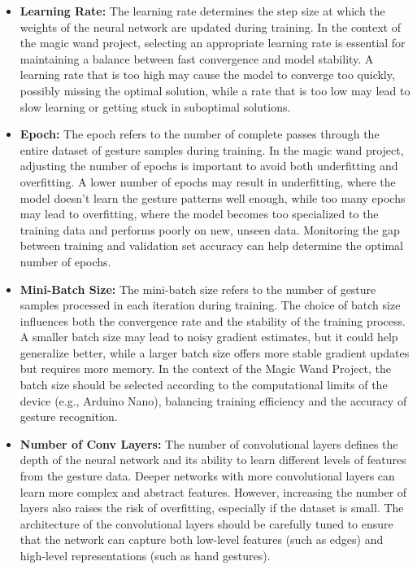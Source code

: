 \begin{itemize}
	\item \textbf{Learning Rate:} The learning rate determines the step size at which the weights of the neural network are updated during training. In the context of the magic wand project, selecting an appropriate learning rate is essential for maintaining a balance between fast convergence and model stability. A learning rate that is too high may cause the model to converge too quickly, possibly missing the optimal solution, while a rate that is too low may lead to slow learning or getting stuck in suboptimal solutions.
	
	\item \textbf{Epoch:} The epoch refers to the number of complete passes through the entire dataset of gesture samples during training. In the magic wand project, adjusting the number of epochs is important to avoid both underfitting and overfitting. A lower number of epochs may result in underfitting, where the model doesn't learn the gesture patterns well enough, while too many epochs may lead to overfitting, where the model becomes too specialized to the training data and performs poorly on new, unseen data. Monitoring the gap between training and validation set accuracy can help determine the optimal number of epochs.
	
	\item \textbf{Mini-Batch Size:} The mini-batch size refers to the number of gesture samples processed in each iteration during training. The choice of batch size influences both the convergence rate and the stability of the training process. A smaller batch size may lead to noisy gradient estimates, but it could help generalize better, while a larger batch size offers more stable gradient updates but requires more memory. In the context of the Magic Wand Project, the batch size should be selected according to the computational limits of the device (e.g., Arduino Nano), balancing training efficiency and the accuracy of gesture recognition.
	
	\item \textbf{Number of Conv Layers:} The number of convolutional layers defines the depth of the neural network and its ability to learn different levels of features from the gesture data. Deeper networks with more convolutional layers can learn more complex and abstract features. However, increasing the number of layers also raises the risk of overfitting, especially if the dataset is small. The architecture of the convolutional layers should be carefully tuned to ensure that the network can capture both low-level features (such as edges) and high-level representations (such as hand gestures).
	

\end{itemize}
